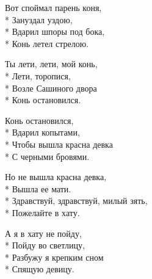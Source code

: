 \medskip

\begin{minipage}{\linewidth}
Вот споймал парень коня,\\*
Зануздал уздою,\\*
Вдарил шпоры под бока,\\*
Конь летел стрелою.\\
\end{minipage}\par\medskip\nobreak

\medskip

\begin{minipage}{\linewidth}
Ты лети, лети, мой конь,\\*
Лети, торопися,\\*
Возле Сашиного двора\\*
Конь остановился.\\
\end{minipage}\par\medskip\nobreak

\medskip

\begin{minipage}{\linewidth}
Конь остановился,\\*
Вдарил копытами,\\*
Чтобы вышла красна девка\\*
С черными бровями.\\
\end{minipage}\par\medskip\nobreak

\medskip

\begin{minipage}{\linewidth}
Но не вышла красна девка,\\*
Вышла ее мати.\\*
Здравствуй, здравствуй, милый зять,\\*
Пожелайте в хату.\\
\end{minipage}\par\medskip\nobreak

\medskip

\begin{minipage}{\linewidth}
А я в хату не пойду,\\*
Пойду во светлицу,\\*
Разбужу я крепким сном\\*
Спящую девицу.\\
\end{minipage}\par\medskip\nobreak

